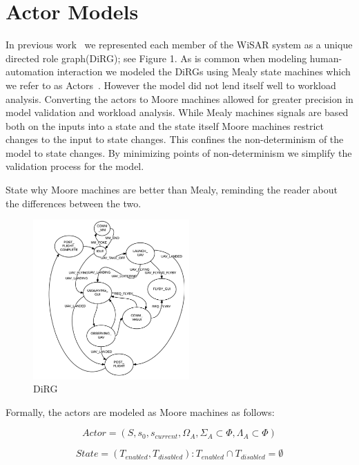 \section{Actor Models} 

In previous work~\cite{gledhill2013modelinguas} we represented each member of the WiSAR system as a unique directed role graph(DiRG); see Figure 1. As is common
when modeling human-automation interaction we modeled the DiRGs using Mealy state machines which we refer to as Actors~\cite{bolton2013litreview}. However the model did not lend itself well to workload analysis. Converting the actors to Moore machines allowed for greater precision in model validation and workload analysis. While Mealy machines signals are based both on the inputs into a state and the state itself Moore machines restrict changes to the input to state changes. This confines the non-determinism of the model to state changes. By minimizing points of non-determinism we simplify the validation process for the model.

{\sc State why Moore machines are better than Mealy, reminding the reader about the differences between the two.}

\begin{figure}[h]
\center
\setlength{\abovecaptionskip}{1mm}
\setlength{\belowcaptionskip}{1mm}
\setlength{\textfloatsep}{1mm}
\setlength{\floatsep}{1mm}
\includegraphics[height=2.4in]{DiRG.png}
\caption{DiRG}
\label{fig:dirg}
\end{figure}

Formally, the actors are modeled as Moore machines as follows:

\begin{equation}
 	Actor = (S, s_0, s_{current}, \Omega_A, \Sigma_A \subset \Phi, \Lambda_A
 	\subset \Phi)
 \label{eq:actor}
 \end{equation}

 \begin{equation}
	State = (T_{enabled}, T_{disabled}) : T_{enabled} \cap T_{disabled} = \emptyset
 \label{eq:state}
\end{equation}

